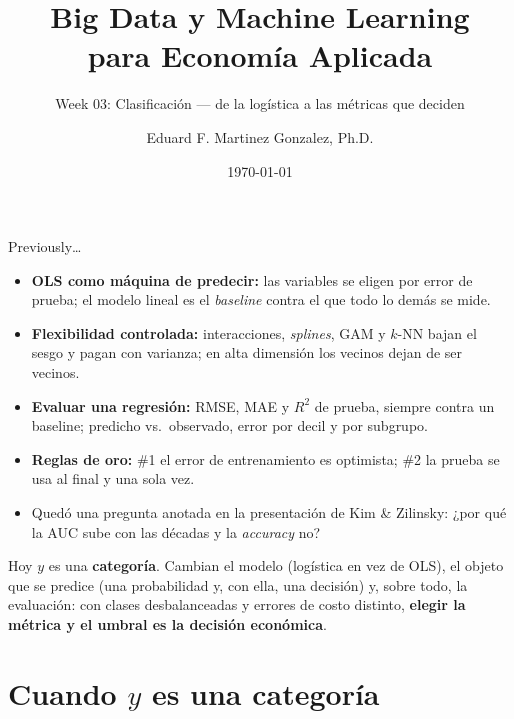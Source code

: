 \documentclass{beamer}
\title[BDML]{Big Data y Machine Learning \\ para Economía Aplicada}
\subtitle{Week 03: Clasificación --- de la logística a las métricas que deciden}
\author{Eduard F. Martinez Gonzalez, Ph.D.}
\institute[]{Departamento de Economía, Universidad Icesi}
\date{\today}
\newcommand{\1}{\mathbb{I}}
\begin{document}
\begin{frame}
\titlepage
\end{frame}

\begin{frame}{Previously\ldots}
\small
\begin{itemize}\itemsep5pt
  \item \textbf{OLS como máquina de predecir:} las variables se eligen por error de prueba; el modelo lineal es el \emph{baseline} contra el que todo lo demás se mide. \pause
  \item \textbf{Flexibilidad controlada:} interacciones, \emph{splines}, GAM y $k$-NN bajan el sesgo y pagan con varianza; en alta dimensión los vecinos dejan de ser vecinos. \pause
  \item \textbf{Evaluar una regresión:} RMSE, MAE y $R^2$ de prueba, siempre contra un baseline; predicho vs.\ observado, error por decil y por subgrupo. \pause
  \item \textbf{Reglas de oro:} \#1 el error de entrenamiento es optimista; \#2 la prueba se usa al final y una sola vez. \pause
  \item Quedó una pregunta anotada en la presentación de Kim \& Zilinsky: ¿por qué la AUC sube con las décadas y la \emph{accuracy} no?
\end{itemize}
\pause
\vspace{0.1cm}
\begin{block}{Hoy}
$y$ es una \textbf{categoría}. Cambian el modelo (logística en vez de OLS), el objeto que se predice (una probabilidad y, con ella, una decisión) y, sobre todo, la evaluación: con clases desbalanceadas y errores de costo distinto, \textbf{elegir la métrica y el umbral es la decisión económica}.
\end{block}
\end{frame}


\section{Cuando $y$ es una categoría}
\begin{frame}[noframenumbering]
\tableofcontents[currentsection]
\end{frame}
\end{document}
